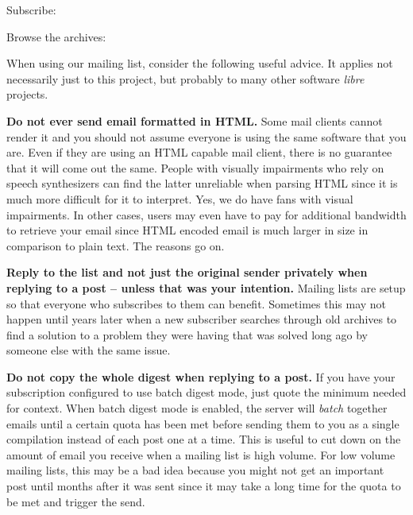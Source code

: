 \blank[2*big]
\startnarrower[3*left]
Subscribe:\crlf
{} 

\blank[2*big]
Browse the archives:\crlf
{}
\stopnarrower
\crlf

When using our mailing list, consider the following useful advice. It applies not necessarily just to this project, but probably to many other software {\it libre} projects.

\startitemize[4]
\item
{\bf Do not ever send email formatted in HTML.} Some mail clients cannot render it and you should not assume everyone is using the same software that you are. Even if they are using an HTML capable mail client, there is no guarantee that it will come out the same. People with visually impairments who rely on speech synthesizers can find the latter unreliable when parsing HTML since it is much more difficult for it to interpret. Yes, we do have fans with visual impairments. In other cases, users may even have to pay for additional bandwidth to retrieve your email since HTML encoded email is much larger in size in comparison to plain text. The reasons go on.

\item
{\bf Reply to the list and not just the original sender privately when replying to a post -- unless that was your intention.} Mailing lists are setup so that everyone who subscribes to them can benefit. Sometimes this may not happen until years later when a new subscriber searches through old archives to find a solution to a problem they were having that was solved long ago by someone else with the same issue.

\item
{\bf Do not copy the whole digest when replying to a post.} If you have your subscription configured to use batch digest mode, just quote the minimum needed for context. When batch digest mode is enabled, the server will {\it batch} together emails until a certain quota has been met before sending them to you as a single compilation instead of each post one at a time. This is useful to cut down on the amount of email you receive when a mailing list is high volume. For low volume mailing lists, this may be a bad idea because you might not get an important post until months after it was sent since it may take a long time for the quota to be met and trigger the send.

